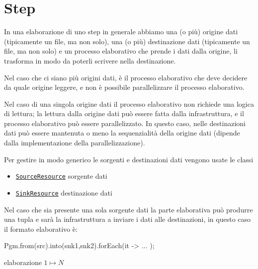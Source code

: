 \chapter{Step}

In una elaborazione di uno step in generale abbiamo una (o più) origine dati
(tipicamente un file, ma non solo), una (o più) destinazione dati (tipicamente
un file, ma non solo) e un processo elaborativo che prende i dati dalla origine,
li trasforma in modo da poterli scrivere nella destinazione.

Nel caso che ci siano più origini dati, è il processo elaborativo che deve
decidere da quale origine leggere, e non è possibile parallelizzare il processo
elaborativo.

Nel caso di una singola origine dati il processo elaborativo non richiede una
logica di lettura; la lettura dalla origine dati può essere fatta dalla
infrastruttura, e il processo elaborativo può essere parallelizzato.
In questo caso, nelle destinazioni dati può essere mantenuta o meno la
sequenzialità della origine dati (dipende dalla implementazione della
parallelizzazione).

Per gestire in modo generico le sorgenti e destinazioni dati vengono usate le
classi
\begin{itemize}
    \item \hyperref[sec:srcRes]{\texttt{SourceResource}} sorgente dati
    \item \hyperref[sec:snkRes]{\texttt{SinkResource}} destinazione dati
\end{itemize}

Nel caso che sia presente una sola sorgente dati la parte elaborativa può
produrre una tupla e sarà la infrastruttura a inviare i dati alle destinazioni,
in questo caso il formato elaborativo è:
\begin{elisting}[!htb]
    \begin{javacode}
        Pgm.from(src).into(snk1,snk2).forEach(it -> { ... });
    \end{javacode}
    \caption{elaborazione $1\mapsto N$}
    \label{lst:processTuple}
\end{elisting}


